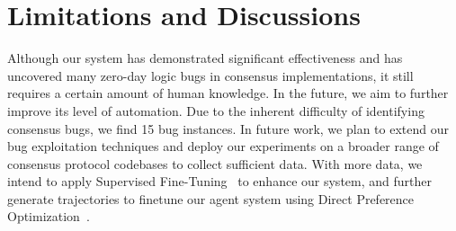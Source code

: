 \documentclass{article}
\theoremstyle{plain}
\theoremstyle{definition}
\theoremstyle{remark}
\newcommand{\consensustester}{Agora\xspace}
\begin{document}












\section{Limitations and Discussions}
\label{sec:limitation}




Although our system has demonstrated significant effectiveness and has uncovered many zero-day logic bugs in consensus implementations, it still requires a certain amount of human knowledge. In the future, we aim to further improve its level of automation.
Due to the inherent difficulty of identifying consensus bugs, we find 15 bug instances. In future work, we plan to extend our bug exploitation techniques and deploy our experiments on a broader range of consensus protocol codebases to collect sufficient data. With more data, we intend to apply Supervised Fine-Tuning~\cite{Wei2021FinetunedLM,Ouyang2022TrainingLM} to enhance our system, and further generate trajectories to finetune our agent system using Direct Preference Optimization~\cite{Rafailov2023DirectPO}.
\end{document}
